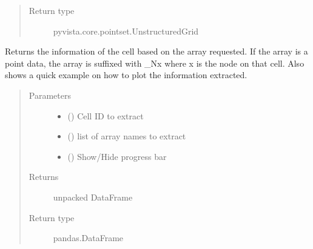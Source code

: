 \documentclass[letterpaper,10pt,english]{sphinxmanual}
\begin{document}
\begin{fulllineitems}
\begin{fulllineitems}
\begin{quote}
\begin{description}
\item[{Return type}] \leavevmode
pyvista.core.pointset.UnstructuredGrid

\end{description}\end{quote}

\end{fulllineitems}


\begin{fulllineitems}
\label{\detokenize{openfdem:openfdem.openfdem.Model.extract_cell_info}}
Returns the information of the cell based on the array requested.
If the array is a point data, the array is suffixed with \_Nx where x is the node on that cell.
Also shows a quick example on how to plot the information extracted.
\begin{quote}\begin{description}
\item[{Parameters}] \leavevmode\begin{itemize}
\item {} 
 () \textendash{} Cell ID to extract

\item {} 
 (\sphinxstyleliteralemphasis{\sphinxupquote{{[}}}\sphinxstyleliteralemphasis{\sphinxupquote{{]}}}) \textendash{} list of array names to extract

\item {} 
 () \textendash{} Show/Hide progress bar

\end{itemize}

\item[{Returns}] \leavevmode
unpacked DataFrame

\item[{Return type}] \leavevmode
pandas.DataFrame


\end{description}
\end{quote}
\end{fulllineitems}
\end{fulllineitems}
\end{document}
